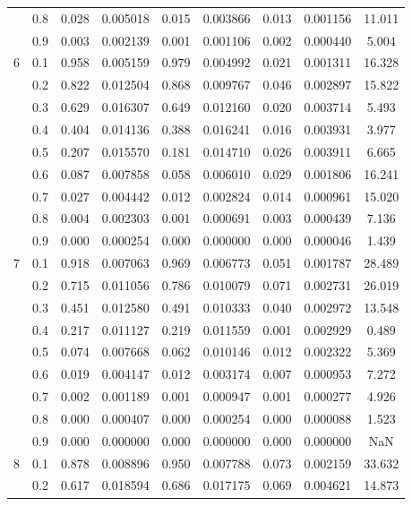 \begin{longtable}{ | c | c || c | c | c | c | c | c | c | }
 & 0.8 & 0.028 & 0.005018 & 0.015 & 0.003866 & 0.013 & 0.001156 & 11.011 \\
 & 0.9 & 0.003 & 0.002139 & 0.001 & 0.001106 & 0.002 & 0.000440 & 5.004 \\
 \hline
\multirow{9}{*}{6} & 0.1 & 0.958 & 0.005159 & 0.979 & 0.004992 & 0.021 & 0.001311 & 16.328 \\
 & 0.2 & 0.822 & 0.012504 & 0.868 & 0.009767 & 0.046 & 0.002897 & 15.822 \\
 & 0.3 & 0.629 & 0.016307 & 0.649 & 0.012160 & 0.020 & 0.003714 & 5.493 \\
 & 0.4 & 0.404 & 0.014136 & 0.388 & 0.016241 & 0.016 & 0.003931 & 3.977 \\
 & 0.5 & 0.207 & 0.015570 & 0.181 & 0.014710 & 0.026 & 0.003911 & 6.665 \\
 & 0.6 & 0.087 & 0.007858 & 0.058 & 0.006010 & 0.029 & 0.001806 & 16.241 \\
 & 0.7 & 0.027 & 0.004442 & 0.012 & 0.002824 & 0.014 & 0.000961 & 15.020 \\
 & 0.8 & 0.004 & 0.002303 & 0.001 & 0.000691 & 0.003 & 0.000439 & 7.136 \\
 & 0.9 & 0.000 & 0.000254 & 0.000 & 0.000000 & 0.000 & 0.000046 & 1.439 \\
 \hline
\multirow{9}{*}{7} & 0.1 & 0.918 & 0.007063 & 0.969 & 0.006773 & 0.051 & 0.001787 & 28.489 \\
 & 0.2 & 0.715 & 0.011056 & 0.786 & 0.010079 & 0.071 & 0.002731 & 26.019 \\
 & 0.3 & 0.451 & 0.012580 & 0.491 & 0.010333 & 0.040 & 0.002972 & 13.548 \\
 & 0.4 & 0.217 & 0.011127 & 0.219 & 0.011559 & 0.001 & 0.002929 & 0.489 \\
 & 0.5 & 0.074 & 0.007668 & 0.062 & 0.010146 & 0.012 & 0.002322 & 5.369 \\
 & 0.6 & 0.019 & 0.004147 & 0.012 & 0.003174 & 0.007 & 0.000953 & 7.272 \\
 & 0.7 & 0.002 & 0.001189 & 0.001 & 0.000947 & 0.001 & 0.000277 & 4.926 \\
 & 0.8 & 0.000 & 0.000407 & 0.000 & 0.000254 & 0.000 & 0.000088 & 1.523 \\
 & 0.9 & 0.000 & 0.000000 & 0.000 & 0.000000 & 0.000 & 0.000000 & NaN \\
 \hline
\multirow{9}{*}{8} & 0.1 & 0.878 & 0.008896 & 0.950 & 0.007788 & 0.073 & 0.002159 & 33.632 \\
 & 0.2 & 0.617 & 0.018594 & 0.686 & 0.017175 & 0.069 & 0.004621 & 14.873 \\

\end{longtable}
